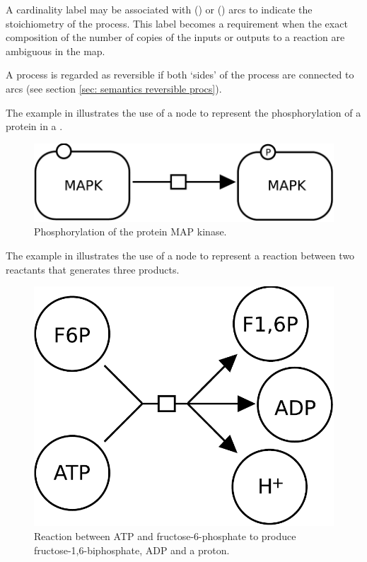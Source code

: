 A cardinality label may be associated with  () or  () arcs to indicate the stoichiometry of the process.  This label becomes a requirement when the exact composition of the number of copies of the inputs or outputs to a reaction are ambiguous in the map.

A process is regarded as reversible if both `sides' of the process are connected to  arcs (see section \ref{sec: semantics reversible procs}).

The example in  illustrates the use of a  node to represent the phosphorylation of a protein in a \PD.

\begin{figure}[H]
  \centering
  \includegraphics[scale = 0.3]{examples/process-phosphorylation}
  \caption{Phosphorylation of the protein MAP kinase.}
  \label{fig:trans-phos}
\end{figure}

The example in  illustrates the use of a  node to represent a reaction between two reactants that generates three products. 

\begin{figure}[H]
  \centering
  \includegraphics[scale = 0.3]{examples/process-reaction}
  \caption{Reaction between ATP and fructose-6-phosphate to produce fructose-1,6-biphosphate, ADP and a proton.}
  \label{fig:trans-react}
\end{figure}

